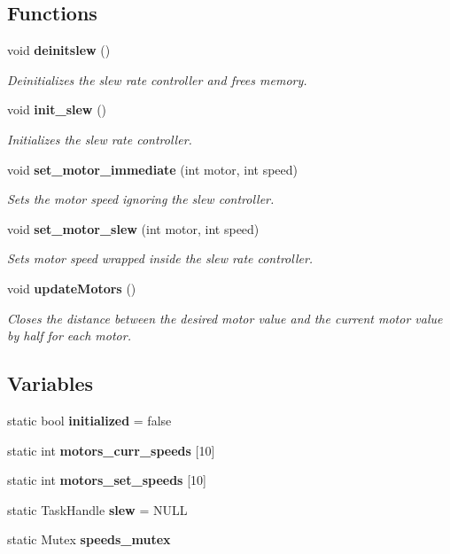 \subsection*{Functions}
\begin{DoxyCompactItemize}
\item 
void \textbf{ deinitslew} ()
\begin{DoxyCompactList}\small\item\em Deinitializes the slew rate controller and frees memory. \end{DoxyCompactList}\item 
void \textbf{ init\+\_\+slew} ()
\begin{DoxyCompactList}\small\item\em Initializes the slew rate controller. \end{DoxyCompactList}\item 
void \textbf{ set\+\_\+motor\+\_\+immediate} (int motor, int speed)
\begin{DoxyCompactList}\small\item\em Sets the motor speed ignoring the slew controller. \end{DoxyCompactList}\item 
void \textbf{ set\+\_\+motor\+\_\+slew} (int motor, int speed)
\begin{DoxyCompactList}\small\item\em Sets motor speed wrapped inside the slew rate controller. \end{DoxyCompactList}\item 
void \textbf{ update\+Motors} ()
\begin{DoxyCompactList}\small\item\em Closes the distance between the desired motor value and the current motor value by half for each motor. \end{DoxyCompactList}\end{DoxyCompactItemize}
\subsection*{Variables}
\begin{DoxyCompactItemize}
\item 
static bool \textbf{ initialized} = false
\item 
static int \textbf{ motors\+\_\+curr\+\_\+speeds} [10]
\item 
static int \textbf{ motors\+\_\+set\+\_\+speeds} [10]
\item 
static Task\+Handle \textbf{ slew} = N\+U\+LL
\item 
static Mutex \textbf{ speeds\+\_\+mutex}
\end{DoxyCompactItemize}


